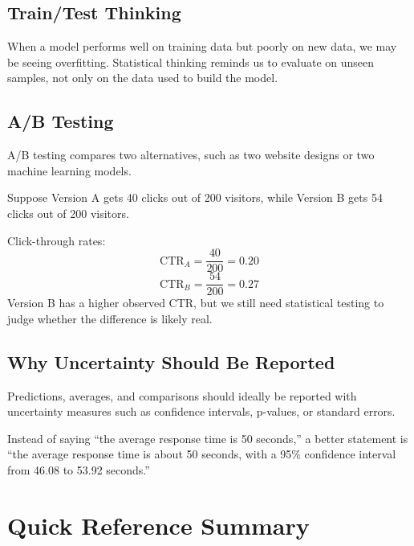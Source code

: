 \documentclass[11pt,a4paper]{article}
\begin{document}
\subsection{Train/Test Thinking}

When a model performs well on training data but poorly on new data, we may be seeing overfitting. Statistical thinking reminds us to evaluate on unseen samples, not only on the data used to build the model.

\subsection{A/B Testing}

A/B testing compares two alternatives, such as two website designs or two machine learning models.

\begin{examplebox}
Suppose Version A gets 40 clicks out of 200 visitors, while Version B gets 54 clicks out of 200 visitors.

Click-through rates:
\[
\text{CTR}_A = \frac{40}{200} = 0.20
\]
\[
\text{CTR}_B = \frac{54}{200} = 0.27
\]
Version B has a higher observed CTR, but we still need statistical testing to judge whether the difference is likely real.
\end{examplebox}

\subsection{Why Uncertainty Should Be Reported}

Predictions, averages, and comparisons should ideally be reported with uncertainty measures such as confidence intervals, p-values, or standard errors.

\begin{conceptbox}
Instead of saying ``the average response time is 50 seconds,'' a better statement is ``the average response time is about 50 seconds, with a 95\% confidence interval from 46.08 to 53.92 seconds.''
\end{conceptbox}

\section{Quick Reference Summary}
\end{document}
